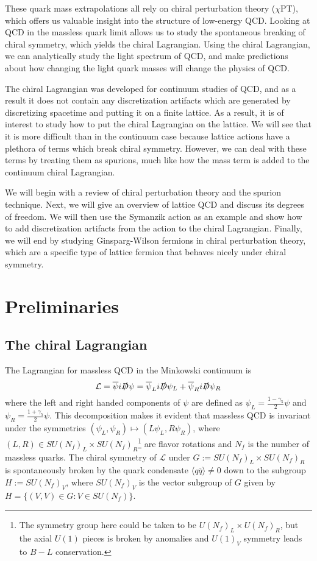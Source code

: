 \documentclass[11pt, oneside]{article}   	%
\theoremstyle{definition}
\begin{document}
These quark mass extrapolations all rely on chiral perturbation theory ($\chi$PT), which offers us valuable insight into the 
structure of low-energy QCD. Looking at QCD in the massless quark limit allows us to study the spontaneous breaking of 
chiral symmetry, which yields the chiral Lagrangian. Using the chiral Lagrangian, we can analytically study the light 
spectrum of QCD, and make predictions about how changing the light quark masses will change the physics of QCD.

The chiral Lagrangian was developed for continuum studies of QCD, and as a result it does not contain any discretization 
artifacts which are generated by discretizing spacetime and putting it on a finite lattice. As a result, it is of interest to 
study how to put the chiral Lagrangian on the lattice. We will see that it is more difficult than in the continuum case because 
lattice actions have a plethora of terms which break chiral symmetry. However, we can deal with these terms by treating 
them as spurions, much like how the mass term is added to the continuum chiral Lagrangian. 

We will begin with a review of chiral perturbation theory and the spurion technique. Next, we will give an overview of lattice 
QCD and discuss its degrees of freedom. We will then use the Symanzik action as an example and show how to add 
discretization artifacts from the action to the chiral Lagrangian. Finally, we will end by studying Ginsparg-Wilson 
fermions in chiral perturbation theory, which are a specific type of lattice fermion that behaves nicely under chiral symmetry.

\section{Preliminaries}

\subsection{The chiral Lagrangian}

The Lagrangian for massless QCD in the Minkowski continuum is
\begin{equation}
	\mathcal L = \overline\psi i\slashed D \psi = \overline\psi_L i\slashed D \psi_L + \overline\psi_R i\slashed D\psi_R
\end{equation}
where the left and right handed components of $\psi$ are defined as $\psi_L = \frac{1 - \gamma_5}{2}\psi$ and $\psi_R 
= \frac{1 + \gamma_5}{2}\psi$. This decomposition makes it evident that massless QCD is invariant under the 
symmetries $(\psi_L, \psi_R)\mapsto (L\psi_L, R\psi_R)$, where $(L, R)\in SU(N_f)_L\times SU(N_f)_R$\footnote{The 
symmetry group here could be taken to be $U(N_f)_L\times U(N_f)_R$, but the axial $U(1)$ pieces is broken by anomalies 
and $U(1)_V$ symmetry leads to $B - L$ conservation.} are flavor rotations and $N_f$ is the number of massless quarks. 
The chiral symmetry of $\mathcal L$ under $G := SU(N_f)_L\times SU(N_f)_R$ is spontaneously broken by the quark 
condensate $\langle q\overline q\rangle\neq 0$ down to the subgroup $H := SU(N_f)_V$, where $SU(N_f)_V$ is the vector 
subgroup of $G$ given by $H = \{(V, V) \in G : V\in SU(N_f)\}$. 
\end{document}
